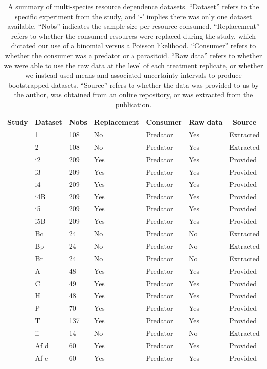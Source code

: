 \begin{table}[!tbp]
\caption{
      A summary of multi-species resource dependence datasets.
      ``Dataset'' refers to the specific experiment from the study, and `-' implies there was only one dataset available.
      ``Nobs'' indicates the sample size per resource consumed.
      ``Replacement'' refers to whether the consumed resources were replaced during the study, which dictated our use of a binomial versus a Poisson likelihood.
      ``Consumer'' refers to whether the consumer was a predator or a parasitoid.
      ``Raw data'' refers to whether we were able to use the raw data at the level of each treatment replicate, or whether we instead used means and associated uncertainty intervals to produce bootstrapped datasets.
      ``Source'' refers to whether the data was provided to us by the author, was obtained from an online repository, or was extracted from the publication.
    \label{table:1pred2preydatasets}} 
\begin{center}
\begin{tabular}{lllllll}
\hline\hline
\multicolumn{1}{c}{Study}&\multicolumn{1}{c}{Dataset}&\multicolumn{1}{c}{Nobs}&\multicolumn{1}{c}{Replacement}&\multicolumn{1}{c}{Consumer}&\multicolumn{1}{c}{Raw data}&\multicolumn{1}{c}{Source}\tabularnewline
\hline
\citet{Colton:1987aa}&1&108&No&Predator&Yes&Extracted\tabularnewline
\citet{Colton:1987aa}&2&108&No&Predator&Yes&Extracted\tabularnewline
\citet{Elliott:2006aa}&i2&209&Yes&Predator&Yes&Provided\tabularnewline
\citet{Elliott:2006aa}&i3&209&Yes&Predator&Yes&Provided\tabularnewline
\citet{Elliott:2006aa}&i4&209&Yes&Predator&Yes&Provided\tabularnewline
\citet{Elliott:2006aa}&i4B&209&Yes&Predator&Yes&Provided\tabularnewline
\citet{Elliott:2006aa}&i5&209&Yes&Predator&Yes&Provided\tabularnewline
\citet{Elliott:2006aa}&i5B&209&Yes&Predator&Yes&Provided\tabularnewline
\citet{Iyer:1996aa}&Bc&24&No&Predator&No&Extracted\tabularnewline
\citet{Iyer:1996aa}&Bp&24&No&Predator&No&Extracted\tabularnewline
\citet{Iyer:1996aa}&Br&24&No&Predator&No&Extracted\tabularnewline
\citet{Kalinkat:2011bd}&A&48&Yes&Predator&Yes&Provided\tabularnewline
\citet{Kalinkat:2011bd}&C&49&Yes&Predator&Yes&Provided\tabularnewline
\citet{Kalinkat:2011bd}&H&48&Yes&Predator&Yes&Provided\tabularnewline
\citet{Kalinkat:2011bd}&P&70&Yes&Predator&Yes&Provided\tabularnewline
\citet{Kalinkat:2011bd}&T&137&Yes&Predator&Yes&Provided\tabularnewline
\citet{Krylov:1992aa}&ii&14&No&Predator&No&Extracted\tabularnewline
\citet{Lester:2002aa}&Af d&60&Yes&Predator&Yes&Provided\tabularnewline
\citet{Lester:2002aa}&Af e&60&Yes&Predator&Yes&Provided\tabularnewline

\end{tabular}
\end{center}
\end{table}
